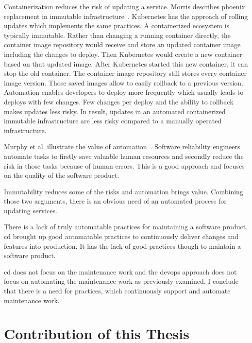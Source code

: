 Containerization reduces the risk of updating a service. Morris describes phoenix
replacement in immutable infrastructure~\cite{infra_as_code_phoenix}. Kubernetes has the
approach of rolling updates which implements the same practices. A containerized ecosystem
is typically immutable. Rather than changing a running container directly, the container
image repository would receive and store an updated container image including the changes
to deploy. Then Kubernetes would create a new container based on that updated image. After
Kubernetes started this new container, it can stop the old container. The container image
repository still stores every container image version. Those saved images allow to easily
rollback to a previous version. Automation enables developers to deploy more frequently
which usually leads to deploys with few changes. Few changes per deploy and the ability to
rollback makes updates less risky. In result, updates in an automated containerized
immutable infrastructure are less risky compared to a manually operated infrastructure.

Murphy et al. illustrate the value of automation~\cite{sre_automation}. Software
reliability engineers automate tasks to firstly save valuable human resources and secondly
reduce the risk in those tasks because of human errors. This is a good approach and
focuses on the quality of the software product.

Immutability reduces some of the risks and automation brings value. Combining those two
arguments, there is an obvious need of an automated process for updating services.

There is a lack of truly automatable practices for maintaining a software
product. \gls{cd} brought up good automatable practices to continuously deliver changes
and features into production. It has the lack of good practices though to maintain a
software product.

\gls{cd} does not focus on the maintenance work and the devops approach does not focus on
automating the maintenance work as previously examined. I conclude that there is a need
for practices, which continuously support and automate maintenance work.

\section{Contribution of this Thesis}

